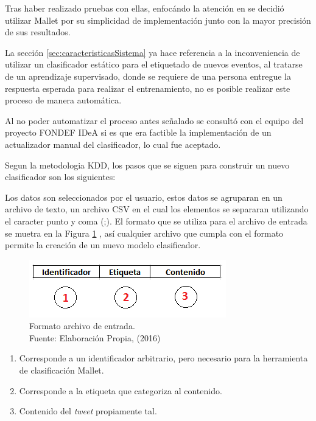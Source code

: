 Tras haber realizado pruebas con ellas, enfocándo la atención en se decidió utilizar Mallet por su simplicidad de implementación junto con la mayor precisión de sus resultados.

La sección \ref{sec:caracteristicasSistema} ya hace referencia a la inconveniencia de utilizar un clasificador estático para el etiquetado de nuevos eventos, al tratarse de un aprendizaje supervisado, donde se requiere de una persona entregue la respuesta esperada para realizar el entrenamiento, no es posible realizar este proceso de manera automática.

Al no poder automatizar el proceso antes señalado se consultó con el equipo del proyecto FONDEF IDeA si es que era factible la implementación de un actualizador manual del clasificador, lo cual fue aceptado.

Segun la metodologia KDD, los pasos que se siguen para construir un nuevo clasificador son los siguientes:

Los datos son seleccionados por el usuario, estos datos se agruparan en un archivo de texto, un archivo CSV en el cual los elementos se separaran utilizando el caracter punto y coma (;). El formato que se utiliza para el archivo de entrada se muetra en la Figura \ref{fig:formatoFig} , así cualquier archivo que cumpla con el formato permite la creación de un nuevo modelo clasificador.

\begin{figure}[H]
	\centering
	\captionsetup{justification=centering}
	\includegraphics[scale=0.8]{images/FormatoArchivoEntrada.png}
	\caption[Formato archivo de entrada.]{Formato archivo de entrada.\\Fuente: Elaboración Propia, (2016)}
	\label{fig:formatoFig}
\end{figure}

\begin{enumerate}
\item Corresponde a un identificador arbitrario, pero necesario para la herramienta de clasificación Mallet.
\item Corresponde a la etiqueta que categoriza al contenido.
\item Contenido del \textit{tweet} propiamente tal.
\end{enumerate}

